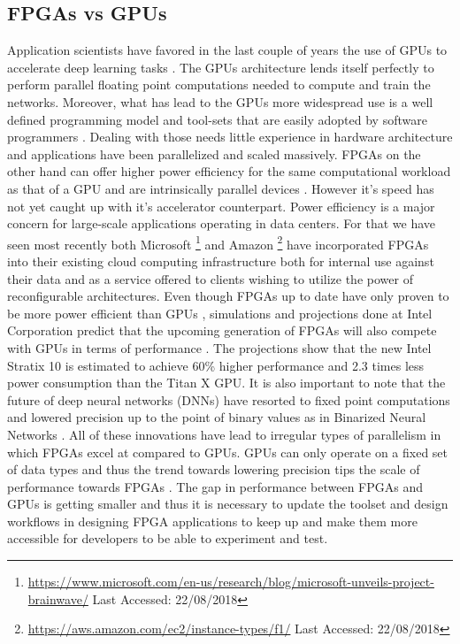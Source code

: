 \subsection{FPGAs vs GPUs}
Application scientists have favored in the last couple of years the use of GPUs to accelerate deep learning tasks \cite{raina2009large}. The GPUs architecture lends itself perfectly to perform parallel floating point computations needed to compute and train the networks. Moreover, what has lead to the GPUs more widespread use is a well defined programming model and tool-sets that are easily adopted by software programmers \cite{cuda}. Dealing with those needs little experience in hardware architecture and applications have been parallelized and scaled massively. 
FPGAs on the other hand can offer higher power efficiency for the same computational workload as that of a GPU and are intrinsically parallel devices \cite{nurvitadhi2017can}. However it’s speed has not yet caught up with it’s accelerator counterpart. Power efficiency is a major concern for large-scale applications operating in data centers. For that we have seen most recently both Microsoft \footnote{\url{https://www.microsoft.com/en-us/research/blog/microsoft-unveils-project-brainwave/} Last Accessed: 22/08/2018} and Amazon \footnote{\url{https://aws.amazon.com/ec2/instance-types/f1/} Last Accessed: 22/08/2018} have incorporated FPGAs into their existing cloud computing infrastructure both for internal use against their data and as a service offered to clients wishing to utilize the power of reconfigurable architectures. 
Even though FPGAs up to date have only proven to be more power efficient than GPUs \cite{deepfpga, nurvitadhi2017can}, simulations and projections done at Intel Corporation predict that the upcoming generation of FPGAs will also compete with GPUs in terms of performance \cite{nurvitadhi2017can}. The projections show that the new Intel Stratix 10 is estimated to achieve 60\% higher performance and 2.3 times less power consumption than the Titan X GPU. It is also important to note that the future of deep neural networks (DNNs) have resorted to fixed point computations and lowered precision up to the point of binary values as in Binarized Neural Networks \cite{hubara2016binarized}. All of these innovations have lead to irregular types of parallelism in which FPGAs excel at compared to GPUs. GPUs can only operate on a fixed set of data types and thus the trend towards lowering precision tips the scale of performance towards FPGAs \cite{hubara2016binarized, sahin2006neuralprec, nurvitadhi2017can}. The gap in performance between FPGAs and GPUs is getting smaller and thus it is necessary to update the toolset and design workflows in designing FPGA applications to keep up and make them more accessible for developers to be able to experiment and test. 


